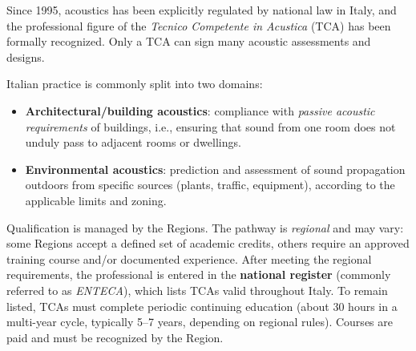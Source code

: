 \begin{tcolorbox}[colback=lightgray, colframe=gray, title=Regulatory framework in Italy ]
Since 1995, acoustics has been explicitly regulated by national law in Italy, and the professional
figure of the \emph{Tecnico Competente in Acustica} (TCA) has been formally recognized.
Only a TCA can sign many acoustic assessments and designs.

Italian practice is commonly split into two domains:
\begin{itemize}
  \item \textbf{Architectural/building acoustics}:
        compliance with \emph{passive acoustic requirements} of buildings, i.e., ensuring that sound from one room does not unduly pass to adjacent rooms or dwellings.
  \item \textbf{Environmental acoustics}:
        prediction and assessment of sound propagation outdoors from specific sources (plants, traffic, equipment), according to the applicable limits and zoning.
\end{itemize}

Qualification is managed by the Regions. The pathway is \emph{regional} and may vary:
some Regions accept a defined set of academic credits, others require an approved training
course and/or documented experience. After meeting the regional requirements, the
professional is entered in the \textbf{national register} (commonly referred to as \emph{ENTECA}),
which lists TCAs valid throughout Italy.
To remain listed, TCAs must complete periodic continuing education
(about 30 hours in a multi-year cycle, typically 5--7 years, depending on regional rules).
Courses are paid and must be recognized by the Region.

\end{tcolorbox}